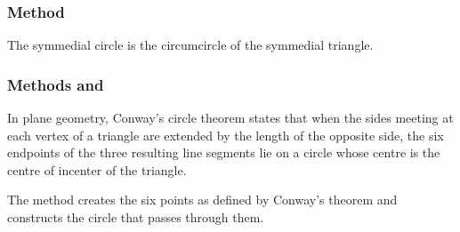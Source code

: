 \vspace{1em}

\begin{tkzexample}[latex=8cm]
\end{tkzexample}



\subsubsection{Method } %
\label{ssub:method_triangle_symmedial_circ}
The symmedial circle is the circumcircle of the symmedial triangle.

\begin{tkzexample}[latex=8cm]
\end{tkzexample}




\subsubsection{Methods  and } %
\label{ssub:method_triangle_conway}

In plane geometry, Conway's circle theorem states that when the sides meeting at each vertex of a triangle are extended by the length of the opposite side, the six endpoints of the three resulting line segments lie on a circle whose centre is the centre of incenter of the triangle.

The method  creates the six points as defined by Conway’s theorem and constructs the circle that passes through them.

